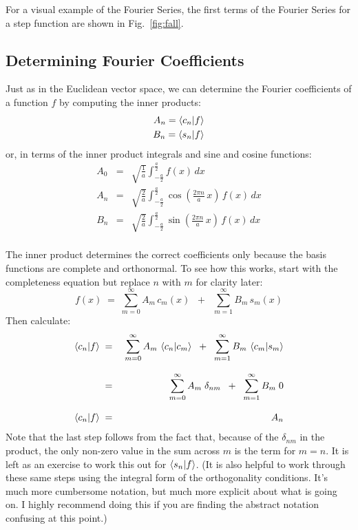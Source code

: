 \documentclass[12pt]{book}
\begin{document}
For a visual example of the Fourier Series, the first terms of the Fourier Series for a step function are shown in Fig.~\ref{fig:fall}.  

\subsection{Determining Fourier Coefficients}
\label{sect:coeff}

Just as in the Euclidean vector space, we can determine the Fourier coefficients of a function $f$ by computing the inner products:
\begin{eqnarray*}
A_n = \braket{c_n| f} \\
B_n = \braket{s_n| f}
\end{eqnarray*}
or, in terms of the inner product integrals and sine and cosine functions:
\begin{eqnarray*}
A_0 &=& \sqrt{\frac{1}{a}} \int_{-\frac{a}{2}}^{\frac{a}{2}} f(x) \, dx \\
A_n &=& \sqrt{\frac{2}{a}} \int_{-\frac{a}{2}}^{\frac{a}{2}} 
\cos\left(\frac{2\pi n}{a} \, x \right) \, f(x) \, dx \\
B_n &=& \sqrt{\frac{2}{a}} \int_{-\frac{a}{2}}^{\frac{a}{2}} 
\sin\left(\frac{2\pi n}{a} \, x \right) \, f(x) \, dx \\
\end{eqnarray*}


The inner product determines the correct coefficients only because the basis functions are complete and orthonormal.  To see how this works, start with the completeness equation but replace $n$ with $m$ for clarity later:
\begin{equation*}
f(x) \; = \; \sum_{m=0}^{\infty}  A_m \, c_m(x)  \; \; + \; \; \sum_{m=1}^{\infty} B_m \, s_m(x)
\end{equation*}
Then calculate:
\begin{eqnarray*}
\braket{c_n| f} \; &=& \; \sum_{m=0}^{\infty}  A_m \, \braket{c_n| c_m}  \; \; + \; \; \sum_{m=1}^{\infty} B_m \, \braket{c_m| s_m} \\[8pt]
 &=& \; \sum_{m=0}^{\infty}  A_m \; \delta_{nm}  \; \; + \; \; \sum_{m=1}^{\infty} B_m \; 0 \\[8pt]
\braket{c_n| f} \; &=& A_n \\
\end{eqnarray*}
Note that the last step follows from the fact that, because of the $\delta_{nm}$ in the product, the only non-zero value in the sum across $m$ is the term for $m=n$.  It is left as an exercise to work this out for $\braket{s_n | f}$.  (It is also helpful to work through these same steps using the integral form of the orthogonality conditions.  It's much more cumbersome notation, but much more explicit about what is going on.  I highly recommend doing this if you are finding the abstract notation confusing at this point.)
\end{document}

